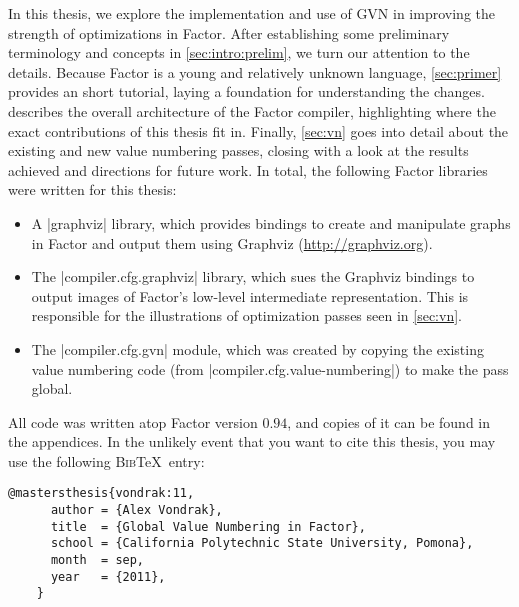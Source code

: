In this thesis, we explore the implementation and use of \gls{GVN} in improving
the strength of optimizations in Factor.  After establishing some preliminary
terminology and concepts in \cref{sec:intro:prelim}, we turn our attention to
the details.  Because Factor is a young and relatively unknown language,
\cref{sec:primer} provides an short tutorial, laying a foundation for
understanding the changes.   describes the overall
architecture of the Factor compiler, highlighting where the exact contributions
of this thesis fit in.  Finally, \cref{sec:vn} goes into detail about the
existing and new value numbering passes, closing with a look at the results
achieved and directions for future work.  In total, the following Factor
libraries were written for this thesis:
\begin{itemize}
  \item A \factor|graphviz| library, which provides bindings to create and
        manipulate graphs in Factor and output them using Graphviz
        (\url{http://graphviz.org}).
  \item The \factor|compiler.cfg.graphviz| library, which sues the Graphviz
        bindings to output images of Factor's low-level intermediate
        representation.  This is responsible for the illustrations of
        optimization passes seen in \cref{sec:vn}.
  \item The \factor|compiler.cfg.gvn| module, which was created by copying the
        existing value numbering code (from
        \factor|compiler.cfg.value-numbering|) to make the pass global.
\end{itemize}

All code was written atop Factor version $0.94$, and copies of it can be found
in the appendices.  In the unlikely event that you want to cite this thesis,
you may use the following \textsc{Bib}\TeX~entry:
\begin{center}
  \begin{Verbatim}[gobble=4,frame=single]
    @mastersthesis{vondrak:11,
      author = {Alex Vondrak},
      title  = {Global Value Numbering in Factor},
      school = {California Polytechnic State University, Pomona},
      month  = sep,
      year   = {2011},
    }
  \end{Verbatim}
\end{center}


